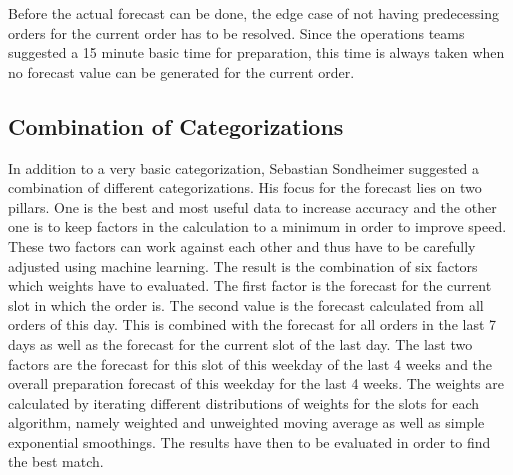 Before the actual forecast can be done, the edge case of not having predecessing orders for the current order has to be resolved. Since the operations teams suggested a 15 minute basic time for preparation, this time is always taken when no forecast value can be generated for the current order.
\subsection{Combination of Categorizations}\label{subsection:Categorizing by Order}
In addition to a very basic categorization, Sebastian Sondheimer suggested a combination of different categorizations. His focus for the forecast lies on two pillars. One is the best and most useful data to increase accuracy and the other one is to keep factors in the calculation to a minimum in order to improve speed. These two factors can work against each other and thus have to be carefully adjusted using machine learning. The result is the combination of six factors which weights have to evaluated. The first factor is the forecast for the current slot in which the order is. The second value is the forecast calculated from all orders of this day. This is combined with the forecast for all orders in the last 7 days as well as the forecast for the current slot of the last day. The last two factors are the forecast for this slot of this weekday of the last 4 weeks and the overall preparation forecast of this weekday for the last 4 weeks. The weights are calculated by iterating different distributions of weights for the slots for each algorithm, namely weighted and unweighted moving average as well as simple exponential smoothings. The results have then to be evaluated in order to find the best match.
